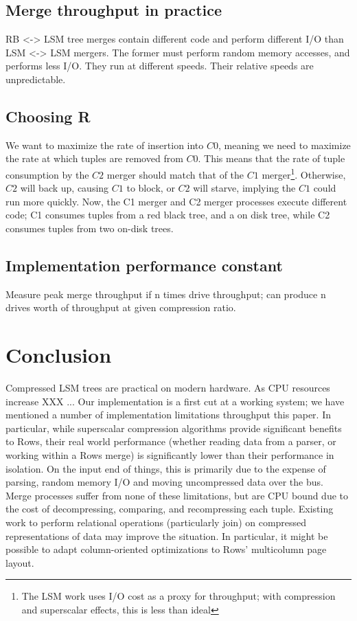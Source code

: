 \documentclass{sig-alternate-sigmod08}
\newcommand{\rows}{Rows\xspace}
\newcommand{\rowss}{Rows'\xspace}
\begin{document}
\subsection{Merge throughput in practice}

RB <-> LSM tree merges contain different code and perform different
I/O than LSM <-> LSM mergers.  The former must perform random memory
accesses, and performs less I/O.  They run at different speeds.  Their
relative speeds are unpredictable.

\subsection{Choosing R}

We want to maximize the rate of insertion into $C0$, meaning we need
to maximize the rate at which tuples are removed from $C0$.  This means
that the rate of tuple consumption by the $C2$ merger should match
that of the $C1$ merger\footnote{The LSM work uses I/O cost as a proxy
  for throughput; with compression and superscalar effects, this is
  less than ideal}.  Otherwise, $C2$ will back up, causing $C1$ to
block, or $C2$ will starve, implying the $C1$ could run more quickly.
Now, the C1 merger and C2 merger processes execute different code; C1
consumes tuples from a red black tree, and a on disk tree, while C2
consumes tuples from two on-disk trees.

\subsection{Implementation performance constant}
Measure peak merge throughput if n times drive throughput; can produce
n drives worth of throughput at given compression ratio.

\section{Conclusion}

Compressed LSM trees are practical on modern hardware.  As CPU
resources increase XXX ... Our implementation is a first cut at a
working system; we have mentioned a number of implementation
limitations throughput this paper.  In particular, while superscalar
compression algorithms provide significant benefits to \rows, their
real world performance (whether reading data from a parser, or working
within a \rows merge) is significantly lower than their performance in
isolation.  On the input end of things, this is primarily due to the
expense of parsing, random memory I/O and moving uncompressed data
over the bus.  Merge processes suffer from none of these limitations,
but are CPU bound due to the cost of decompressing, comparing, and
recompressing each tuple.  Existing work to perform relational
operations (particularly join) on compressed representations of data
may improve the situation.  In particular, it might be possible to
adapt column-oriented optimizations to \rowss multicolumn page layout.
\end{document}
